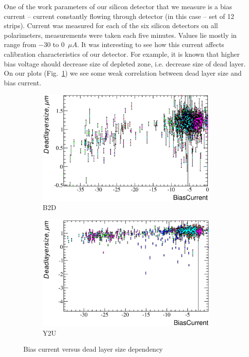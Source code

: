 \documentclass[a4paper,12pt]{article}
\begin{document}
One of the work parameters of our silicon detector that we measure is a bias current -- current
constantly flowing through detector (in this case -- set of 12 strips). Current was measured
for each of the six silicon detectors on all polarimeters, measurements were taken each five
minutes. Values lie mostly in range from $-30$ to $0$~$\mu A$. It was interesting to see how
this current affects calibration characteristics of our detector. For example, it is known 
that higher bias voltage should decrease size of depleted zone, i.e. decrease size of dead layer.
On our plots (Fig.~\ref{fig:bc_vs_xdl}) we see some weak correlation between dead layer size and bias
current.

\begin{figure}[p]
\begin{subfigure}[b]{0.5\textwidth}
\includegraphics[width=\textwidth]{gfx/run13_alpha_study/B2D/c_hBiasCurrent_DeadLayerSize.eps}
\caption{B2D}
\end{subfigure}
\begin{subfigure}[b]{0.5\textwidth}
\includegraphics[width=\textwidth]{gfx/run13_alpha_study/Y2U/c_hBiasCurrent_DeadLayerSize.eps}
\caption{Y2U}
\end{subfigure}
\caption{Bias current versus dead layer size dependency}
\label{fig:bc_vs_xdl}
\end{figure}
\end{document}
